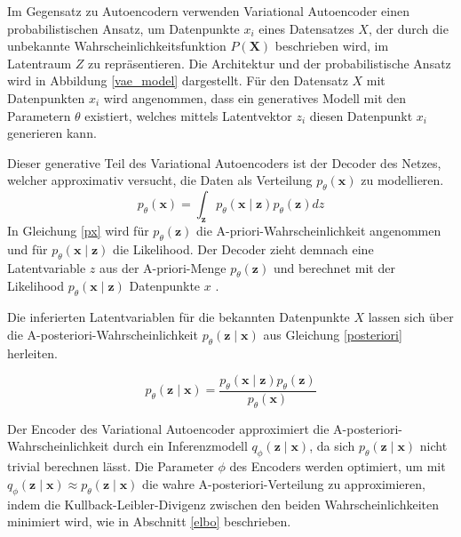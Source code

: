 Im Gegensatz zu Autoencodern verwenden Variational Autoencoder einen probabilistischen Ansatz, um Datenpunkte $x_i$ eines Datensatzes $X$, der durch die unbekannte Wahrscheinlichkeitsfunktion $P(\mathbf{X})$ beschrieben wird, im Latentraum $Z$ zu repräsentieren. 
Die Architektur und der probabilistische Ansatz wird in Abbildung \ref{vae_model} dargestellt.
Für den Datensatz $X$ mit Datenpunkten $x_i$ wird angenommen, dass ein generatives Modell mit den Parametern $\theta$ existiert, welches mittels Latentvektor $z_i$ diesen Datenpunkt $x_i$ generieren kann.

Dieser generative Teil des Variational Autoencoders ist der Decoder des  Netzes, welcher approximativ versucht, die Daten als Verteilung $p_\theta (\mathbf{x})$ zu modellieren.
\begin{equation}
    \label{px}
p_\theta (\mathbf{x}) = \int_{\mathbf{z}} p_\theta (\mathbf{x\mid z}) p_\theta (\mathbf{z}) dz
\end{equation}
In Gleichung \ref{px} wird für $p_\theta (\mathbf{z})$ die A-priori-Wahrscheinlichkeit angenommen und für $p_\theta (\mathbf{x\mid z})$ die Likelihood. Der Decoder zieht demnach eine Latentvariable $z$ aus der A-priori-Menge $p_\theta (\mathbf{z})$ und berechnet mit der Likelihood $p_\theta (\mathbf{x\mid z})$ Datenpunkte $x$ \citep{vae2}.

Die inferierten Latentvariablen für die bekannten Datenpunkte $X$ lassen sich über die A-posteriori-Wahrscheinlichkeit $p_\theta (\mathbf{z\mid x})$ aus Gleichung \ref{posteriori} herleiten. 

\begin{equation}
    \label{posteriori}
    p_\theta (\mathbf{z\mid x}) = \frac{p_\theta (\mathbf{x\mid z}) p_\theta (\mathbf{z})}{p_\theta(\mathbf{x})}
\end{equation}

Der Encoder des Variational Autoencoder approximiert die A-posteriori-Wahrscheinlichkeit durch ein Inferenzmodell $q_\phi (\mathbf{z\mid x})$, da sich $p_\theta (\mathbf{z\mid x})$ nicht trivial berechnen lässt.
Die Parameter $\phi$ des Encoders werden optimiert, um mit $q_\phi (\mathbf{z\mid x}) \approx p_\theta (\mathbf{z\mid x})$ die wahre A-posteriori-Verteilung zu approximieren, indem die Kullback-Leibler-Divigenz zwischen den beiden Wahrscheinlichkeiten minimiert wird, wie in Abschnitt \ref{elbo} beschrieben.



